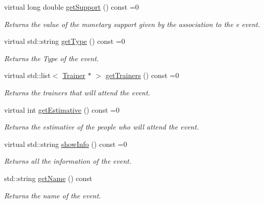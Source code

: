 \begin{DoxyCompactItemize}
virtual long double \hyperlink{classEvent_a9170bfcbd9b00015dafc5d5cc69a2cfe}{get\+Support} () const =0
\begin{DoxyCompactList}\small\item\em Returns the value of the monetary support given by the association to the e event. \end{DoxyCompactList}\item 
virtual std\+::string \hyperlink{classEvent_a224dbd9a9aee5937ba0c8ea1a056af1f}{get\+Type} () const =0
\begin{DoxyCompactList}\small\item\em Returns the Type of the event. \end{DoxyCompactList}\item 
virtual std\+::list$<$ \hyperlink{classTrainer}{Trainer} $\ast$ $>$ \hyperlink{classEvent_a11aad3e5a7ee85bc61b6811d050c5d70}{get\+Trainers} () const =0
\begin{DoxyCompactList}\small\item\em Returns the trainers that will attend the event. \end{DoxyCompactList}\item 
virtual int \hyperlink{classEvent_a18ac55c239f648fc0ad5687c426f2a8f}{get\+Estimative} () const =0
\begin{DoxyCompactList}\small\item\em Returns the estimative of the people who will attend the event. \end{DoxyCompactList}\item 
virtual std\+::string \hyperlink{classEvent_aaa38f467e933c57190d43351bdb817be}{show\+Info} () const =0
\begin{DoxyCompactList}\small\item\em Returns all the information of the event. \end{DoxyCompactList}\item 
std\+::string \hyperlink{classEvent_a36453ab5a21b660a61f2a0369e2689e8}{get\+Name} () const
\begin{DoxyCompactList}\small\item\em Returns the name of the event. \end{DoxyCompactList}\end{DoxyCompactItemize}
